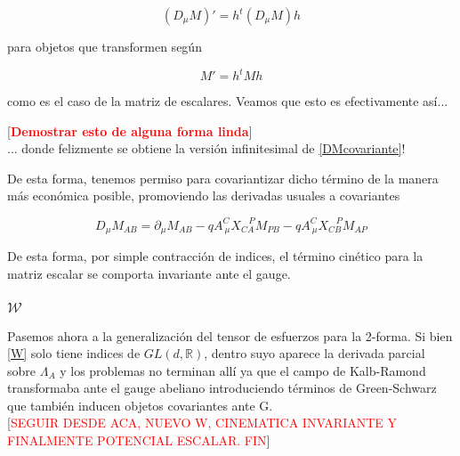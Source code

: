 \documentclass{article}
\numberwithin{equation}{section}
\begin{document}
\begin{equation}\label{DMcovariante}
\left(D_{\mu} M\right)' = h^{t} \left(D_{\mu} M\right) h 
\end{equation}

para objetos que transformen según

\begin{equation}
M' = h^{t} M h
\end{equation}

como es el caso de la matriz de escalares. Veamos que esto es efectivamente así...

[\textcolor{red}{\textbf{Demostrar esto de alguna forma linda}}]\\

... donde felizmente se obtiene la versión infinitesimal de \ref{DMcovariante}! 

De esta forma, tenemos permiso para covariantizar dicho término de la manera más económica posible, promoviendo las derivadas usuales a covariantes


\begin{boxquation}
	\begin{equation}
	D_{\mu} M_{A B} = \partial_{\mu}  M_{A B} -q A^C_{\ \mu} X_{C A}^{\ \ \ \ P} M_{P B} - q A^C_{\ \mu} X_{C B}^{\ \ \ \ P} M_{A P}
	\end{equation}
\end{boxquation}

De esta forma, por simple contracción de indices, el término cinético para la matriz escalar se comporta invariante ante el gauge.\\

\subsubsection{ $ \bm{\mathcal{W}} $}

Pasemos ahora a la generalización del tensor de esfuerzos para la 2-forma. Si bien \ref{W} solo tiene indices de $ GL(d,\mathbb{R}) $, dentro suyo aparece la derivada parcial sobre $ \Lambda_A $ y los problemas no terminan allí ya que el campo de Kalb-Ramond transformaba ante el gauge abeliano introduciendo términos de Green-Schwarz que también inducen objetos covariantes ante G.\\

[\textcolor{red}{SEGUIR DESDE ACA, NUEVO W, CINEMATICA INVARIANTE Y FINALMENTE POTENCIAL ESCALAR. FIN}]
\end{document}
